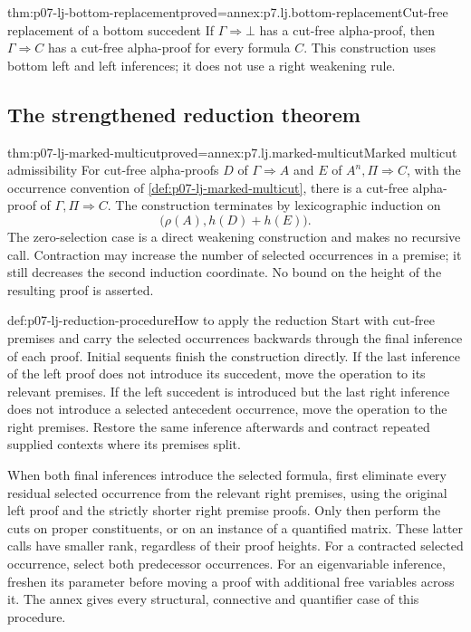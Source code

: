 \begin{hblemma}{thm:p07-lj-bottom-replacement}{proved=annex:p7.lj.bottom-replacement}{Cut-free replacement of a bottom succedent}
If \(\Gamma\Rightarrow\bot\) has a cut-free alpha-proof, then
\(\Gamma\Rightarrow C\) has a cut-free alpha-proof for every formula
\(C\).  This construction uses bottom left and left inferences; it does
not use a right weakening rule.
\end{hblemma}

\subsection{The strengthened reduction theorem}
\label{sec:p07-lj-marked-reduction}

\begin{hbtheorem}{thm:p07-lj-marked-multicut}{proved=annex:p7.lj.marked-multicut}{Marked multicut admissibility}
For cut-free alpha-proofs \(D\) of \(\Gamma\Rightarrow A\) and \(E\)
of \(A^n,\Pi\Rightarrow C\), with the occurrence convention of
\ref{def:p07-lj-marked-multicut}, there is a cut-free alpha-proof of
\(\Gamma,\Pi\Rightarrow C\).  The construction terminates by
lexicographic induction on
\[
                \bigl(\rho(A),h(D)+h(E)\bigr).
\]
The zero-selection case is a direct weakening construction and makes no
recursive call.  Contraction may increase the number of selected
occurrences in a premise; it still decreases the second induction
coordinate.  No bound on the height of the resulting proof is asserted.
\end{hbtheorem}

\begin{hbmethod}{def:p07-lj-reduction-procedure}{How to apply the reduction}
Start with cut-free premises and carry the selected occurrences backwards
through the final inference of each proof.  Initial sequents finish the
construction directly.  If the last inference of the left proof does not
introduce its succedent, move the operation to its relevant premises.  If
the left succedent is introduced but the last right inference does not
introduce a selected antecedent occurrence, move the operation to the right
premises.  Restore the same inference afterwards and contract repeated
supplied contexts where its premises split.

When both final inferences introduce the selected formula, first eliminate
every residual selected occurrence from the relevant right premises,
using the original left proof and the strictly shorter right premise
proofs.  Only then perform the cuts on proper constituents, or on an
instance of a quantified matrix.  These latter calls have smaller rank,
regardless of their proof heights.  For a contracted selected occurrence,
select both predecessor occurrences.  For an eigenvariable inference,
freshen its parameter before moving a proof with additional free variables
across it.  The annex gives every structural, connective and quantifier
case of this procedure.
\end{hbmethod}

